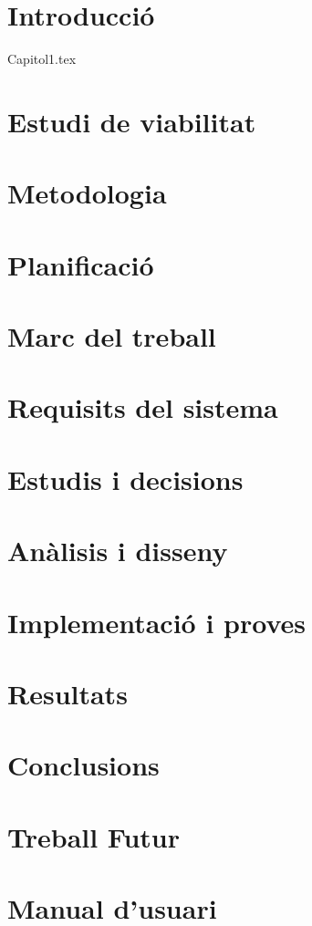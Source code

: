 \documentclass[12pt,a4paper,titlepage,twoside]{report}
\title{\titulo}
\author{\autor}
\begin{document}
\setcounter{secnumdepth}{3}



\tableofcontents
\chapter{Introducció}
\label{chap:c1}
	{Capitol1.tex}
\chapter{Estudi de viabilitat}
\label{chap:c2}
\chapter{Metodologia}
\label{chap:c3}
\chapter{Planificació}
\label{chap:c4}
\chapter{Marc del treball}
\label{chap:c5}
\chapter{Requisits del sistema}
\label{chap:c6}
\chapter{Estudis i decisions}
\label{chap:c7}
\chapter{Anàlisis i disseny}
\label{chap:c8}
\chapter{Implementació i proves}
\label{chap:c9}
\chapter{Resultats}
\label{chap:c10}
\chapter{Conclusions}
\label{chap:c11}
\chapter{Treball Futur}
\label{chap:c12}

\nocite{*}



\pagebreak

\chapter{Manual d'usuari}
\label{chap:manual}
\end{document}
